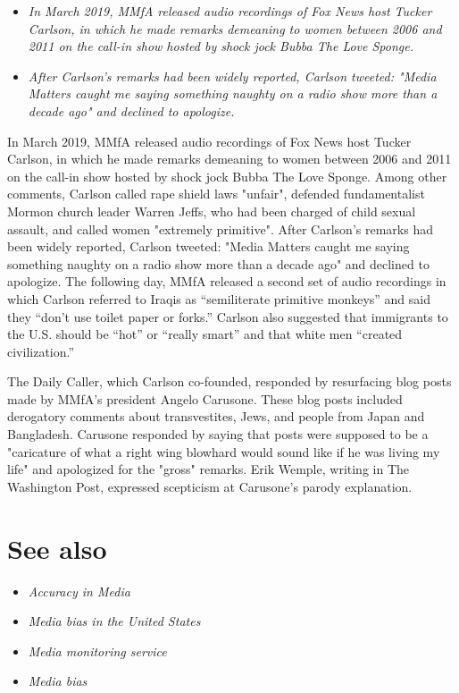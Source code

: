 \begin{itemize}
\item
  \emph{In March 2019, MMfA released audio recordings of Fox News host
  Tucker Carlson, in which he made remarks demeaning to women between
  2006 and 2011 on the call-in show hosted by shock jock Bubba The Love
  Sponge.}
\item
  \emph{After Carlson's remarks had been widely reported, Carlson
  tweeted: "Media Matters caught me saying something naughty on a radio
  show more than a decade ago" and declined to apologize.}
\end{itemize}

In March 2019, MMfA released audio recordings of Fox News host Tucker
Carlson, in which he made remarks demeaning to women between 2006 and
2011 on the call-in show hosted by shock jock Bubba The Love Sponge.
Among other comments, Carlson called rape shield laws "unfair", defended
fundamentalist Mormon church leader Warren Jeffs, who had been charged
of child sexual assault, and called women "extremely primitive". After
Carlson's remarks had been widely reported, Carlson tweeted: "Media
Matters caught me saying something naughty on a radio show more than a
decade ago" and declined to apologize. The following day, MMfA released
a second set of audio recordings in which Carlson referred to Iraqis as
``semiliterate primitive monkeys'' and said they ``don't use toilet
paper or forks.'' Carlson also suggested that immigrants to the U.S.
should be ``hot'' or ``really smart'' and that white men ``created
civilization.''

The Daily Caller, which Carlson co-founded, responded by resurfacing
blog posts made by MMfA's president Angelo Carusone. These blog posts
included derogatory comments about transvestites, Jews, and people from
Japan and Bangladesh. Carusone responded by saying that posts were
supposed to be a "caricature of what a right wing blowhard would sound
like if he was living my life" and apologized for the "gross" remarks.
Erik Wemple, writing in The Washington Post, expressed scepticism at
Carusone's parody explanation.

\section{See also}\label{see-also}

\begin{itemize}
\item
  \emph{Accuracy in Media}
\item
  \emph{Media bias in the United States}
\item
  \emph{Media monitoring service}
\item
  \emph{Media bias}
\end{itemize}

